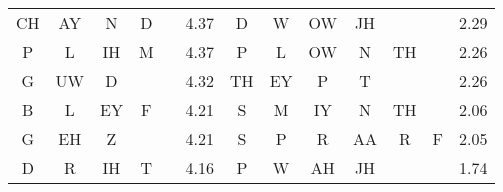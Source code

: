 \begin{center}
\begin{longtable}{c@{ } c@{ } c@{ } c@{ } c r | c@{ } c@{ } c@{ } c@{ } c@{ } c r }
CH & AY & N  & D  &         & 4.37  & D  & W  & OW & JH &    &     & 2.29 \\
P  & L  & IH & M  &         & 4.37  & P  & L  & OW & N  & TH &     & 2.26 \\
G  & UW & D  &    &         & 4.32  & TH & EY & P  & T  &    &     & 2.26 \\
B  & L  & EY & F  &         & 4.21  & S  & M  & IY & N  & TH &     & 2.06 \\
G  & EH & Z  &    &         & 4.21  & S  & P  & R  & AA & R  & F   & 2.05 \\
D  & R  & IH & T  &         & 4.16  & P  & W  & AH & JH &    &     & 1.74 \\
\bottomrule
\end{longtable}
\end{center}

